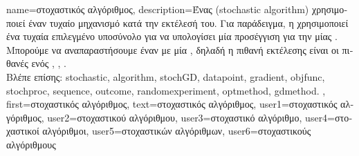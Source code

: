 {name={\foreignlanguage{greek}{στοχαστικός αλγόριθμος}}, 
	description={\foreignlanguage{greek}{Ένας}   
		(stochastic algorithm) \foreignlanguage{greek}{χρησιμοποι\-εί έναν τυχαίο μηχανισμό κατά την εκτέλεσή του. Για παράδειγμα, η} 
		 \foreignlanguage{greek}{χρησιμοποιεί ένα τυχαία επιλεγμένο υποσύνολο}   
		\foreignlanguage{greek}{για να υπολογίσει μία προσέγγιση για την}  \foreignlanguage{greek}{μίας} . 
		\foreignlanguage{greek}{Μπορούμε να αναπαραστήσουμε έναν}   \foreignlanguage{greek}{με 
		μία} , \foreignlanguage{greek}{δηλαδή η πιθανή}  \foreignlanguage{greek}{εκτέλεσης είναι οι 
		πιθανές}  \foreignlanguage{greek}{ενός}  
		\cite{BertsekasProb}, \cite{RandomizedAlgos}, \cite{Gallager13}. 
		\\ 
		\foreignlanguage{greek}{Βλέπε επίσης:} \gls{stochastic}, \gls{algorithm}, \gls{stochGD}, \gls{datapoint}, \gls{gradient}, \gls{objfunc}, \gls{stochproc}, 
		\gls{sequence}, \gls{outcome}, \gls{randomexperiment}, \gls{optmethod}, \gls{gdmethod}. },
	first={\foreignlanguage{greek}{στοχαστικός αλγόριθμος}},
	text={\foreignlanguage{greek}{στοχαστικός αλγόριθμος}},
	user1={\foreignlanguage{greek}{στοχαστικός αλγόριθμος}}, %
	user2={\foreignlanguage{greek}{στοχαστικού αλγόριθμου}}, %
	user3={\foreignlanguage{greek}{στοχαστικό αλγόριθμο}}, %
	user4={\foreignlanguage{greek}{στοχαστικοί αλγόριθμοι}}, %
	user5={\foreignlanguage{greek}{στοχαστικών αλγόριθμων}}, %
	user6={\foreignlanguage{greek}{στοχαστικούς αλγόριθμους}} %
}

